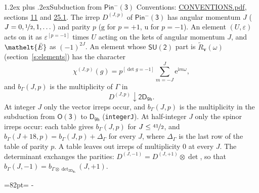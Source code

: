 \documentclass[10pt,a4paper]{article}
\makeatletter
\renewcommand\section{\@startsection{section}{1}{\z@}{-3ex plus -1ex minus -.2ex}%
  {1.2ex plus .2ex}{\normalfont\large\sffamily\bfseries\color{parttitle}}}
\newcommand{\needspace}[1]{\par\penalty-100\begingroup\dimen0=#1\relax\dimen2=\pagegoal
  \advance\dimen2-\pagetotal\ifdim\dimen0>\dimen2\relax\ifdim\dimen2>0pt\vfil\break\fi\fi
  \endgroup}
\numberwithin{equation}{section}
\newcommand{\eltfont}[1]{{\let\sigma\eltsigma\mathelt{#1}}}
\newcommand{\grp}[1]{\mathsf{#1}}
\newcommand{\elt}[1]{\eltfont{#1}}
\newcommand{\ptag}[1]{\mathrm{#1}}
\newcommand{\iverson}[1]{[#1]}
\newcommand{\restr}[2]{#1\!\downarrow#2}
\newcommand{\vv}{\mathbf{v}}
\newcommand{\iunit}{\mathrm{i}}
\newcommand{\expe}{\mathrm{e}}
\newcommand{\irrJp}[2]{D^{(#1,#2)}}
\newcommand{\irrprod}{\otimes}
\newcommand{\barred}[1]{\bar{#1}}
\newcommand{\lift}[1]{\tilde{#1}}
\makeatother
\begin{document}
\section{Subduction from \texorpdfstring{$\grp{Pin^{-}(3)}$}{Pin(3)}}\label{s:subduction_parent}
Conventions: \href{../../CONVENTIONS.pdf}{CONVENTIONS.pdf}, sections \href{../../../rotation/CONVENTIONS.pdf\#conv.11}{11} and \href{../../CONVENTIONS.pdf\#conv.25.1}{25.1}.
\leavevmode\label{n:index.J}\label{n:index.parity}\label{n:irrep.o3}The irrep $\irrJp{J}{p}$ of \href{Pinminus3.pdf}{$\grp{Pin^{-}(3)}$} has angular momentum $J$ ($J = 0, \nicefrac{1}{2}, 1, \dots$) and parity $p$ ($\ptag{g}$ for $p = +1$, $\ptag{u}$ for $p = -1$). An element $(U, \varepsilon)$ acts on it as $\varepsilon^{[p = -1]}$ times $U$ acting on the kets of angular momentum $J$, and $\elt{\barred{E}}$ as $(-1)^{2J}$. \label{n:function.character.parent}\label{n:function.multiplicity}An element whose $\grp{SU(2)}$ part is $\lift{R}_{\vv}(\omega)$ (section~\ref{s:elements}) has the character
\begin{equation}\label{e:chi}\chi^{(J,p)}(g) = p^{\iverson{\det g = -1}}\sum_{m=-J}^{J} \expe^{\iunit m\omega},\end{equation}
and $b_\Gamma(J, p)$ is the multiplicity of $\Gamma$ in
\begin{equation}\label{e:parent}\restr{\irrJp{J}{p}}{\grp{2D_{9h}}}.\end{equation}
At integer $J$ only the vector irreps occur, and $b_\Gamma(J, p)$ is the multiplicity in the subduction from $\grp{O(3)}$ to \href{../../../rotation/data/pdf/D9h.pdf}{$\grp{D_{9h}}$} (\texttt{integerJ}). \label{n:index.increment}At half-integer $J$ only the spinor irreps occur: each table gives $b_\Gamma(J, p)$ for $J \le \nicefrac{41}{2}$, and $b_\Gamma(J + 18, p) = b_\Gamma(J, p) + \Delta_\Gamma$ for every $J$, where $\Delta_\Gamma$ is the last row of the table of parity $p$. A table leaves out irreps of multiplicity 0 at every $J$.
\leavevmode\label{n:operator.determinant.character}The determinant exchanges the parities: $\irrJp{J}{-1} = \irrJp{J}{+1} \irrprod \det$, so that $b_\Gamma(J, -1) = b_{\Gamma \irrprod \det_{\grp{2D_{9h}}}}(J, +1)$.
\needspace{82pt}
\end{document}
